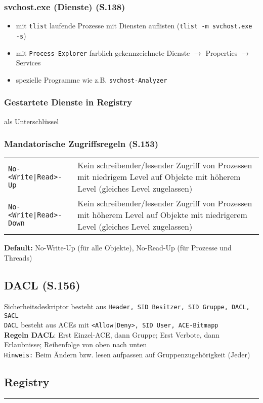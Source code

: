 \begin{multicols}{3}
\subsubsection{svchost.exe (Dienste) (S.138)}
\begin{itemize}[leftmargin=*]
	\item mit \texttt{tlist} laufende Prozesse mit Diensten auflisten (\texttt{tlist -m svchost.exe -s})
	\item mit \texttt{Process-Explorer} farblich gekennzeichnete Dienste $\rightarrow$ Properties $\rightarrow$ Services
	\item spezielle Programme wie z.B. \texttt{svchost-Analyzer}
\end{itemize}

\subsubsection{Gestartete Dienste in Registry}
 als Unterschlüssel

\subsubsection{Mandatorische Zugriffsregeln (S.153)}
\begin{tabular}{@{}p{\the\MyLen}%
		@{}p{\linewidth-\the\MyLen}@{}}
	\texttt{No-<Write|Read>-Up} & Kein schreibender/lesender Zugriff von Prozessen mit niedrigem Level auf Objekte mit höherem Level (gleiches Level zugelassen) \\
	\texttt{No-<Write|Read>-Down} & Kein schreibender/lesender Zugriff von Prozessen mit höherem Level auf Objekte mit niedrigerem Level (gleiches Level zugelassen) \\
\end{tabular}
\textbf{Default:} No-Write-Up (für alle Objekte), No-Read-Up (für Prozesse und Threads)

\subsection{DACL (S.156)}
Sicherheitsdeskriptor besteht aus \texttt{Header, SID Besitzer, SID Gruppe, DACL, SACL}\\
\texttt{DACL} besteht aus ACEs mit \texttt{<Allow|Deny>, SID User, ACE-Bitmapp}\\
\textbf{Regeln DACL}: Erst Einzel-ACE, dann Gruppe; Erst Verbote, dann Erlaubnisse; Reihenfolge von oben nach unten\\
\texttt{Hinweis:} Beim Ändern bzw. lesen aufpassen auf Gruppenzugehörigkeit (Jeder)





\subsection{Registry}






\rule{0.3\linewidth}{0.25pt}
\scriptsize


\end{multicols}